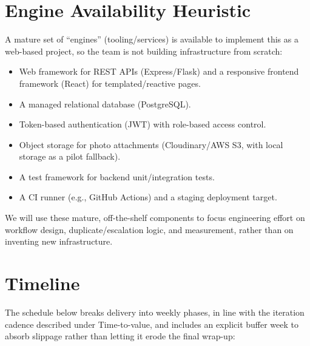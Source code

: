 \documentclass[11pt,a4paper]{article}
\begin{document}
\section{Engine Availability Heuristic}

A mature set of ``engines'' (tooling/services) is available to
implement this as a web-based project, so the team is not building
infrastructure from scratch:

\begin{itemize}[leftmargin=0.7cm]
  \item Web framework for REST APIs (Express/Flask) and a responsive
    frontend framework (React) for templated/reactive pages.
  \item A managed relational database (PostgreSQL).
  \item Token-based authentication (JWT) with role-based access
    control.
  \item Object storage for photo attachments (Cloudinary/AWS S3, with
    local storage as a pilot fallback).
  \item A test framework for backend unit/integration tests.
  \item A CI runner (e.g., GitHub Actions) and a staging deployment
    target.
\end{itemize}

We will use these mature, off-the-shelf components to focus engineering
effort on workflow design, duplicate/escalation logic, and measurement,
rather than on inventing new infrastructure.



\section{Timeline}

The schedule below breaks delivery into weekly phases, in line with the
iteration cadence described under Time-to-value, and includes an
explicit buffer week to absorb slippage rather than letting it erode the
final wrap-up:
\end{document}
